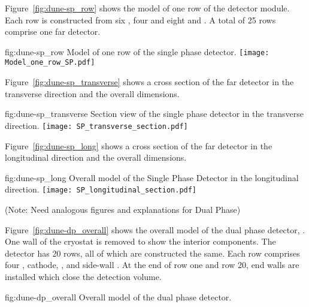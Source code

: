 Figure~\ref{fig:dune-sp_row} shows the model of one row of the
detector module. Each row is constructed from six , four
 and eight  and . A total of 25 rows
comprise one  far detector.
\begin{dunefigure}{fig:dune-sp_row}
  {Model of one row of the single phase detector.}
  \texttt{[image: Model\_one\_row\_SP.pdf]}
\end{dunefigure}




Figure~\ref{fig:dune-sp_transverse} shows a cross section of the
 far detector in the transverse direction and the overall
dimensions.
\begin{dunefigure}{fig:dune-sp_transverse}
  {Section view of the single phase detector in the transverse
    direction.}
  \texttt{[image: SP\_transverse\_section.pdf]}
\end{dunefigure}
Figure~\ref{fig:dune-sp_long} shows a cross section of the
 far detector in the longitudinal direction and the overall
dimensions.
\begin{dunefigure}{fig:dune-sp_long}
  {Overall model of the Single Phase Detector in the longitudinal direction.}
  \texttt{[image: SP\_longitudinal\_section.pdf]}
\end{dunefigure}


(Note: Need analogous figures and explanations for Dual Phase)


Figure~\ref{fig:dune-dp_overall} shows the overall model of the dual
phase detector, . One wall of the cryostat is removed to show
the interior components. The detector has 20
rows, all of which are constructed the same. Each row comprises four
, cathode, ,  and side-wall . 
At the
end of row one and row 20, end walls are installed which close the
detection volume.
\begin{dunefigure}{fig:dune-dp_overall}
  {Overall model of the dual phase detector.}
\end{dunefigure}


